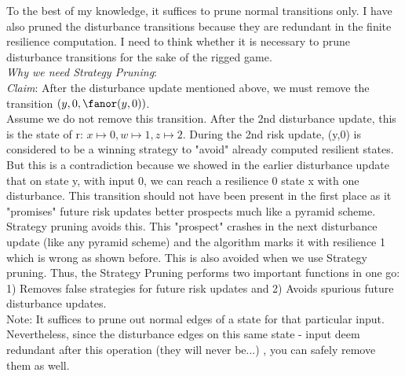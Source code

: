 To the best of my knowledge, it suffices to prune normal transitions only. I have also pruned the disturbance transitions because they are redundant in the finite resilience computation. I need to think whether it is necessary to prune disturbance transitions for the sake of the rigged game.
\\
\emph{Why we need Strategy Pruning}: \\
\emph{Claim}: After the disturbance update mentioned above, we must remove the transition $(y,0,\fanor(y,0))$.\\
Assume we do not remove this transition. After the 2nd disturbance update, this is the state of r: $ x\mapsto 0 , w \mapsto 1 , z \mapsto 2$. During the 2nd risk update, (y,0) is considered to be a winning strategy to "avoid" already computed resilient states. But this is a contradiction because we showed in the earlier disturbance update that on state y, with input 0, we can reach a resilience 0 state x with one disturbance. This transition should not have been present in  the first place as it "promises" future risk updates better prospects much like a pyramid scheme. Strategy pruning avoids this. This "prospect" crashes in the next disturbance update (like any pyramid scheme) and the algorithm marks it with resilience 1 which is wrong as shown before. This is also avoided when we use Strategy pruning. Thus, the Strategy Pruning performs two important functions in one go: 1) Removes false strategies for future risk updates and 2) Avoids spurious future disturbance updates.\\
Note: It suffices to prune  out normal edges of a state for that particular input. Nevertheless, since the disturbance edges on this same state - input deem redundant after this operation (they will never be...) , you can safely remove them as well.

